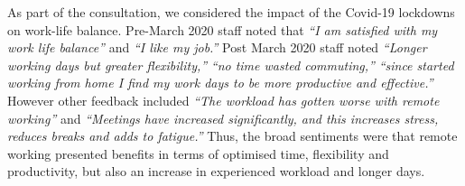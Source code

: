As part of the consultation, we considered the impact of the Covid-19 lockdowns on work-life balance. 
Pre-March 2020 staff noted that \textit{``I am satisfied with my work life balance''} and \textit{``I like my job.''} 
Post March 2020 staff noted \textit{``Longer working days but greater flexibility,''} \textit{``no time wasted commuting,''} \textit{``since started working from home I find my work days to be more productive and effective.''} 
However other feedback included \textit{``The workload has gotten worse with remote working''} and \textit{``Meetings have increased significantly, and this increases stress, reduces breaks and adds to fatigue.''} 
Thus, the broad sentiments were that remote working presented benefits in terms of optimised time, flexibility and productivity, but also an increase in experienced workload and longer days.


